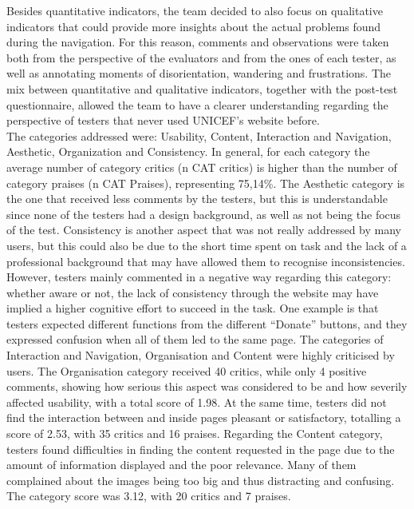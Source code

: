 Besides quantitative indicators, the team decided to also focus on qualitative indicators that could provide more insights about the actual problems found during the navigation. For this reason, comments and observations were taken both from the perspective of the evaluators and from the ones of each tester, as well as annotating moments of disorientation, wandering and frustrations. The mix between quantitative and qualitative indicators, together with the post-test questionnaire, allowed the team to have a clearer understanding regarding the perspective of testers that never used UNICEF’s website before.\\

The categories addressed were: Usability, Content, Interaction and Navigation, Aesthetic, Organization and Consistency. In general, for each category the average number of category critics (n CAT critics) is higher than the number of category praises (n CAT Praises), representing 75,14\%. The Aesthetic category is the one that received less comments by the testers, but this is understandable since none of the testers had a design background, as well as not being the focus of the test. Consistency is another aspect that was not really addressed by many users, but this could also be due to the short time spent on task and the lack of a professional background that may have allowed them to recognise inconsistencies. However, testers mainly commented in a negative way regarding this category: whether aware or not, the lack of consistency through the website may have implied a higher cognitive effort to succeed in the task. One example is that testers expected different functions from the different “Donate” buttons, and they expressed confusion when all of them led to the same page. 
The categories of Interaction and Navigation, Organisation and Content were highly criticised by users. 
The Organisation category received 40 critics, while only 4 positive comments, showing how serious this aspect was considered to be and how severily affected usability, with a total score of 1.98. At the same time, testers did not find the interaction between and inside pages pleasant or satisfactory, totalling a score of 2.53, with 35 critics and 16 praises.
Regarding the Content category, testers found difficulties in finding the content requested in the page due to the amount of information displayed and the poor relevance. Many of them complained about the images being too big and thus distracting and confusing. The category score was 3.12, with 20 critics and 7 praises.\\
 
